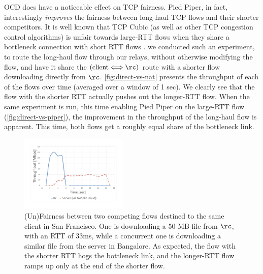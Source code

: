 \documentclass[newfonts=false,format=sigconf,anonymous,10pt,letterpaper]{acmart}
\newcommand{\name}{Pied Piper\xspace}
\begin{document}
OCD does have a noticeable effect on TCP fairness. \name, in fact, interestingly \textit{improves} the fairness between long-haul TCP flows and their shorter competitors.
It is well known that TCP Cubic (as well as other TCP congestion control algorithms) is unfair towards large-RTT flows when they share a bottleneck connection with short RTT flows \cite{kelly2001mathematical}. %
we conducted such an experiment, 
to route the long-haul flow through our relays, without otherwise modifying the flow, and have it share the $(\mbox{client}\Longleftrightarrow\rc)$ route with a shorter flow downloading directly from $\rc$.
\autoref{fig:direct-vs-nat} presents the throughput of each of the flows over time (averaged over a window of 1 sec). We clearly see that the flow with the shorter RTT actually pushes out the longer-RTT flow. When the same experiment is run, this time enabling \name on the large-RTT flow (\autoref{fig:direct-vs-piper}), the improvement in the throughput of the long-haul flow is apparent. This time, both flows get a roughly equal share of the bottleneck link.
 
\begin{figure}[!t]
  \centering
    \includegraphics[width=0.46\textwidth,trim=20mm 25mm 25mm 20mm,clip]{figures/DirectVsNAT.pdf}
    \caption{ (Un)Fairness between two competing flows destined to the same client in San Francisco. One is downloading a 50 MB file from $\rc$, with an RTT of $33$ms, while a concurrent one is downloading a similar file from the server in Bangalore. %
    As expected, the flow with the shorter RTT hogs the bottleneck link, and the longer-RTT flow ramps up only at the end of the shorter flow.
    }
    \label{fig:direct-vs-nat}
\end{figure}
\end{document}
